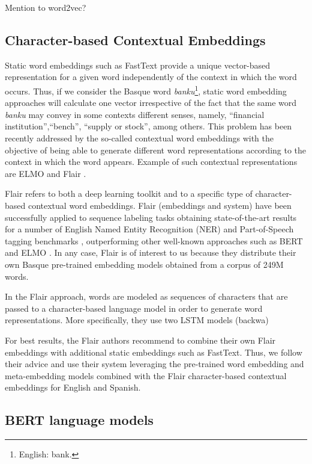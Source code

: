 \documentclass[10pt, a4paper]{article}
\begin{document}
Mention to word2vec?


\subsection{Character-based Contextual Embeddings}\label{sec:build-basq-models:flair}

Static word embeddings such as FastText \cite{fasttext1_bojanowski2017enriching} provide a unique vector-based representation for a given word independently of the context in which the word occurs. Thus, if we consider the Basque word \emph{banku}\footnote{English: bank.}, static word embedding approaches will calculate one vector irrespective of the fact that the same word \emph{banku} may convey in some contexts different senses, namely, ``financial institution'',``bench'', ``supply or stock'', among others. This problem has been recently addressed by the so-called contextual word embeddings with the objective of being able to generate different word representations according to the context in which the word appears. Example of such contextual representations are ELMO \cite{Peters:2018} and Flair \cite{akbik2018coling}.

Flair refers to both a deep learning toolkit and to a specific type of character-based contextual word embeddings. Flair (embeddings and system) have been successfully applied to sequence labeling tasks obtaining state-of-the-art results for a number of English Named Entity Recognition (NER) and Part-of-Speech tagging benchmarks \cite{akbik2018coling}, outperforming other well-known approaches such as BERT and ELMO \cite{devlin2018bert,Peters:2018}. In any case, Flair is of interest to us because they distribute their own Basque pre-trained embedding models obtained from a corpus of 249M words.

In the Flair approach, words are modeled as sequences of characters that are passed to a character-based language model in order to generate word representations. More specifically, they use two LSTM models (backwa)


For best results, the Flair authors recommend to combine their own Flair embeddings with additional static embeddings such as FastText. Thus, we follow their advice and use their system leveraging the pre-trained word embedding and meta-embedding models combined with the Flair character-based contextual embeddings for English and Spanish.


\subsection{BERT language models}\label{sec:build-basq-models:bert}
\end{document}
